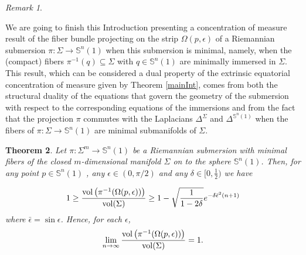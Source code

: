 \documentclass{amsart}
\newtheorem{theorem}{Theorem}[section]
\theoremstyle{definition}
\theoremstyle{remark}
\newtheorem{remark}[theorem]{Remark}
\newcommand{\ese}{\mathbb{S}}
\begin{document}
\begin{remark}
\begin{enumerate}
\end{enumerate}
\end{remark}

We are going to finish this Introduction presenting a concentration of measure result of the fiber bundle projecting on the strip $\Omega(p, \epsilon)$ of a Riemannian submersion $\pi: \Sigma \rightarrow \ese^n(1)$ when this submersion is minimal, namely, when the (compact) fibers $\pi^{-1}(q) \subseteq \Sigma$ with $q \in \ese^n(1)$ are minimally immersed in $\Sigma$. This result, which can be considered a dual property of the extrinsic equatorial concentration of measure given by Theorem \ref{mainInt}, comes from both the structural duality of the equations that govern the geometry of the submersion with respect to the corresponding equations of the immersions and from the fact that the projection $\pi$ commutes with the Laplacians $\Delta^\Sigma$ and $\Delta^{\ese^n(1)}$ when the fibers of $\pi: \Sigma \rightarrow \ese^n(1)$ are minimal submanifolds of $\Sigma$.

\begin{theorem}\label{TeoSub}
Let  $\pi: \Sigma^m \to \mathbb{S}^n(1)$ be a Riemannian submersion with minimal fibers  of the closed $m$-dimensional manifold $\Sigma$ on to the sphere  $\mathbb{S}^n(1)$. Then, for any point $p \in \mathbb{S}^n(1)$ , any  $\epsilon \in (0,\pi/2)$ and any $\delta\in [0,\frac{1}{2})$ we have 

\begin{equation}
1\geq \frac{{\rm vol}\left(\pi^{-1}(\Omega(p,\epsilon))\right)}{{\rm vol}(\Sigma)}\geq  1- \sqrt{\frac{1}{1-2\delta}}e^{-\delta\bar\epsilon^2(n+1)}
\end{equation}
where $\bar\epsilon=\sin\epsilon$. Hence, for each  $\epsilon$,
\begin{equation}
\lim_{n\to\infty}\frac{{\rm vol}\left(\pi^{-1}(\Omega(p,\epsilon))\right)}{{\rm vol}(\Sigma)}=1.
\end{equation}
\end{theorem}
\end{document}

